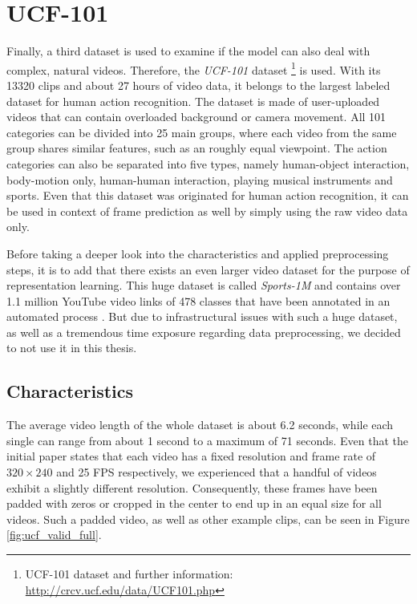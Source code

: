 \section{UCF-101} \label{sec:ds_ucf}

Finally, a third dataset is used to examine if the model can also deal with complex, natural videos. Therefore, the \textit{UCF-101} dataset \parencite{ucf}\footnote{UCF-101 dataset and further information: \url{http://crcv.ucf.edu/data/UCF101.php}} is used. With its \num{13320} clips and about \num{27} hours of video data, it belongs to the largest labeled dataset for human action recognition. The dataset is made of user-uploaded videos that can contain overloaded background or camera movement. All \num{101} categories can be divided into \num{25} main groups,  where each video from the same group shares similar features, such as an roughly equal viewpoint. The action categories can also be separated into five types, namely human-object interaction, body-motion only, human-human interaction, playing musical instruments and sports. Even that this dataset was originated for human action recognition, it can be used in context of frame prediction as well by simply using the raw video data only.

Before taking a deeper look into the characteristics and applied preprocessing steps, it is to add that there exists an even larger video dataset for the purpose of representation learning. This huge dataset is called \textit{Sports-1M} and contains over \num{1.1} million YouTube video links of \num{478} classes that have been annotated in an automated process \parencite{large_video_class}. But due to infrastructural issues with such a huge dataset, as well as a tremendous time exposure regarding data preprocessing, we decided to not use it in this thesis.


\subsection{Characteristics}

The average video length of the whole dataset is about \num{6.2} seconds, while each single can range from about \num{1} second to a maximum of \num{71} seconds. Even that the initial paper states that each video has a fixed resolution and frame rate of $ 320 \times 240 $ and \num{25} FPS respectively, we experienced that a handful of videos exhibit a slightly different resolution. Consequently, these frames have been padded with zeros or cropped in the center to end up in an equal size for all videos. Such a padded video, as well as other example clips, can be seen in Figure \ref{fig:ucf_valid_full}.

